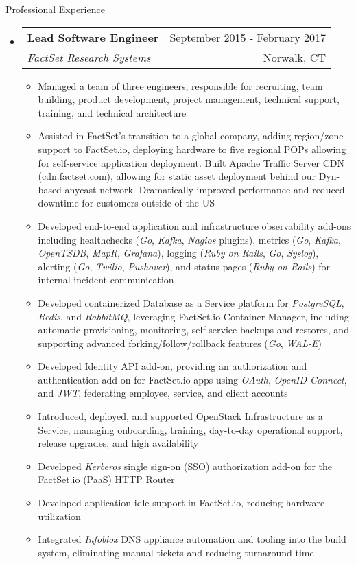 \documentclass[letterpaper,10pt]{article}
\makeatletter
\newenvironment{ressection}[1]{
	\vspace{4pt}
	{\fontfamily{phv}\selectfont\Large#1}
	\begin{itemize}
	\vspace{3pt}
}{
	\end{itemize}
}
\newcommand{\ressubitem}[1]{
	\vspace{-1pt}
	\item \begin{flushleft} #1 \end{flushleft}
}
\newcommand{\resbigitem}[4]{
	\vspace{-5pt}
	\item
	\begin{tabular*}{6in}{l@{\extracolsep{\fill}}r}
		\textbf{#1} & #2 \\
		\textit{#3} & #4\\
	\end{tabular*}
}
\newenvironment{ressubsec}[4]{
	\resbigitem{#1}{#2}{#3}{#4}
	\vspace{-2pt}
	\begin{itemize}
}{
	\end{itemize}
}
\makeatother
\begin{document}
\begin{ressection}{Professional Experience}
	\begin{ressubsec}{Lead Software Engineer}{September 2015 - February 2017}{FactSet Research Systems}{Norwalk, CT}
		\ressubitem{Managed a team of three engineers, responsible for recruiting, team building, product development, project management, technical support, training, and technical architecture}
		\ressubitem{Assisted in FactSet's transition to a global company, adding region/zone support to FactSet.io, deploying hardware to five regional POPs allowing for self-service application deployment.  Built Apache Traffic Server CDN (cdn.factset.com), allowing for static asset deployment behind our Dyn-based anycast network.  Dramatically improved performance and reduced downtime for customers outside of the US}
		\ressubitem{Developed end-to-end application and infrastructure observability add-ons including healthchecks (\textit{Go}, \textit{Kafka}, \textit{Nagios} plugins), metrics (\textit{Go}, \textit{Kafka}, \textit{OpenTSDB}, \textit{MapR}, \textit{Grafana}), logging (\textit{Ruby on Rails}, \textit{Go}, \textit{Syslog}), alerting (\textit{Go}, \textit{Twilio}, \textit{Pushover}), and status pages (\textit{Ruby on Rails}) for internal incident communication}
		\ressubitem{Developed containerized Database as a Service platform for \textit{PostgreSQL}, \textit{Redis}, and \textit{RabbitMQ}, leveraging FactSet.io Container Manager, including automatic provisioning, monitoring, self-service backups and restores, and supporting advanced forking/follow/rollback features (\textit{Go}, \textit{WAL-E})}
		\ressubitem{Developed Identity API add-on, providing an authorization and authentication add-on for FactSet.io apps using \textit{OAuth}, \textit{OpenID Connect}, and \textit{JWT}, federating employee, service, and client accounts}
		\ressubitem{Introduced, deployed, and supported OpenStack Infrastructure as a Service, managing onboarding, training, day-to-day operational support, release upgrades, and high availability}
		\ressubitem{Developed \textit{Kerberos} single sign-on (SSO) authorization add-on for the FactSet.io (PaaS) HTTP Router}
		\ressubitem{Developed application idle support in FactSet.io, reducing hardware utilization}
		\ressubitem{Integrated \textit{Infoblox} DNS appliance automation and tooling into the build system, eliminating manual tickets and reducing turnaround time}
	\end{ressubsec}

	\pagebreak


\end{ressection}
\end{document}
